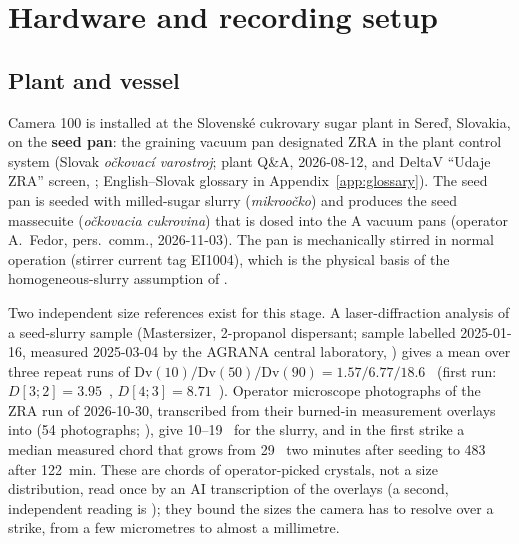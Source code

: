 \section{Hardware and recording setup}\label{sec:hardware}

\subsection{Plant and vessel}\label{sec:plant}

Camera 100 is installed at the Slovensk\'e cukrovary sugar plant in Sere\v{d}, Slovakia, on the \textbf{seed pan}:
the graining vacuum pan designated ZRA in the plant control system (Slovak \emph{o\v{c}kovac\'i varostroj};
plant Q\&A, 2026-08-12, and DeltaV ``Udaje ZRA'' screen, \citealp{SlovenskeCukrovary2026}; English--Slovak
glossary in Appendix~\ref{app:glossary}). The seed pan is seeded with milled-sugar slurry (\emph{mikroo\v{c}ko})
and produces the seed massecuite (\emph{o\v{c}kovacia cukrovina}) that is dosed into the A vacuum pans (operator
A.~Fedor, pers.\ comm., 2026-11-03). The pan is mechanically stirred in normal operation (stirrer current tag
EI1004), which is the physical basis of the homogeneous-slurry assumption of .

Two independent size references exist for this stage. A laser-diffraction analysis of a seed-slurry sample
(Mastersizer, 2-propanol dispersant; sample labelled 2025-01-16, measured 2025-03-04 by the AGRANA central
laboratory, \citealp{Mastersizer2025}) gives a mean over three repeat runs of
$\mathrm{Dv}(10) / \mathrm{Dv}(50) / \mathrm{Dv}(90) = 1.57 / 6.77 / 18.6$~\um{} (first run: $D[3;2] = 3.95$~\um,
$D[4;3] = 8.71$~\um). Operator microscope photographs of
the ZRA run of 2026-10-30, transcribed from their burned-in measurement overlays into
 (54 photographs; ), give 10--19~\um{}
for the slurry, and in the first strike a median measured chord that grows from 29~\um{} two minutes after seeding
to 483~\um{} after 122~min. These are chords of operator-picked crystals, not a size distribution, read once by
an AI transcription of the overlays (a second, independent reading is ); they bound the sizes the camera has to resolve over a strike, from a few micrometres to almost a
millimetre.

